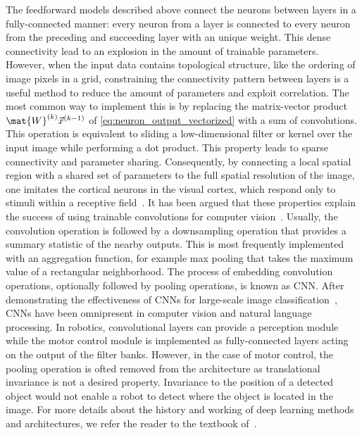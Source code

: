 \documentclass[\home/main.tex]{subfiles}
\begin{document}
The feedforward models described above connect the neurons between layers in a fully-connected manner: every neuron from a layer is connected to every neuron from the preceding and succeeding layer with an unique weight. This dense connectivity lead to an explosion in the amount of trainable parameters. However, when the input data contains topological structure, like the ordering of image pixels in a grid, constraining the connectivity pattern between layers is a useful method to reduce the amount of parameters and exploit correlation. The most common way to implement this is by replacing the matrix-vector product $\mat{W}^{(k)} \vec{x}^{(k-1)}$ of \cref{eq:neuron_output_vectorized} with a sum of convolutions. This operation is equivalent to sliding a low-dimensional filter or kernel over the input image while performing a dot product. This property leads to sparse connectivity and parameter sharing. Consequently, by connecting a local spatial region with a shared set of parameters to the full spatial resolution of the image, one imitates the cortical neurons in the visual cortex, which respond only to stimuli within a receptive field~\autocite{hubel1959receptive}. It has been argued that these properties explain the success of using trainable convolutions for computer vision~\autocite{Goodfellow2016}. Usually, the convolution operation is followed by a downsampling operation that provides a summary statistic of the nearby outputs. This is most frequently implemented with an aggregation function, for example max pooling that takes the maximum value of a rectangular neighborhood. The process of embedding convolution operations, optionally followed by pooling operations, is known as \gls{CNN}. After demonstrating the effectiveness of \glspl{CNN} for large-scale image classification~\autocite{Krizhevsky2012}, \glspl{CNN} have been omnipresent in computer vision and natural language processing. In robotics, convolutional layers can provide a perception module while the motor control module is implemented as fully-connected layers acting on the output of the filter banks. However, in the case of motor control, the pooling operation is ofted removed from the architecture as translational invariance is not a desired property. Invariance to the position of a detected object would not enable a robot to detect where the object is located in the image. For more details about the history and working of deep learning methods and architectures, we refer the reader to the textbook of~\textcite{Goodfellow2016}.
\end{document}
